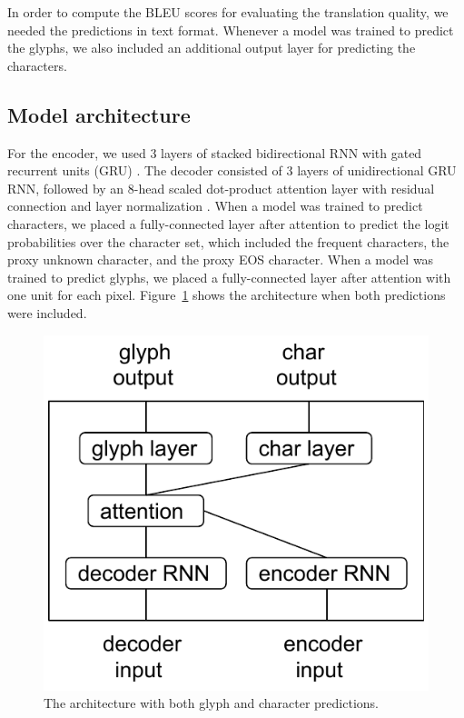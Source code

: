 \documentclass[11pt,twocolumn]{article}
\begin{document}
In order to compute the BLEU scores for evaluating the translation quality,
we needed the predictions in text format.
Whenever a model was trained to predict the glyphs,
we also included an additional output layer for predicting the characters.

\subsection{Model architecture}\label{sec:model-architecture}

For the encoder, we used 3 layers of stacked bidirectional RNN
with gated recurrent units (GRU) \parencite{cho2014learning}.
The decoder consisted of 3 layers of unidirectional GRU RNN,
followed by an 8-head scaled dot-product attention layer \parencite{vaswani2017attention}
with residual connection \parencite{he2016deep}
and layer normalization \parencite{ba2016layer}.
When a model was trained to predict characters,
we placed a fully-connected layer after attention to predict the logit probabilities over the character set,
which included the frequent characters, the proxy unknown character, and the proxy EOS character.
When a model was trained to predict glyphs,
we placed a fully-connected layer after attention with one unit for each pixel.
Figure~\ref{fig:arch} shows the architecture when both predictions were included.

\begin{figure}
  \centering\includegraphics[width=0.8\linewidth]{image/architecture.pdf}
  \caption[]{\label{fig:arch}The architecture with both glyph and character predictions.}
\end{figure}
\end{document}
